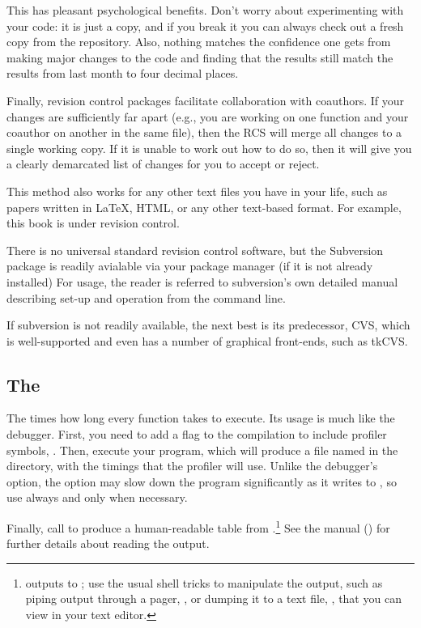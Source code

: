This has pleasant psychological benefits. Don't worry about experimenting
with your code: it is just a copy, and if you break it you can always check
out a fresh copy from the repository. Also, nothing matches the confidence
one gets from making major changes to the code and finding that the
results still match the results from last month to four decimal places.

Finally, revision control packages facilitate collaboration with
coauthors. If your changes are sufficiently far apart (e.g., you are
working on one function and your coauthor on another in the same file),
then the RCS will merge all changes to a single working copy. If
it is unable to work out how to do so, then it will give you a
clearly demarcated list of changes for you to accept or reject.

This method also works for any other text files you have in your
life, such as papers written in \LaTeX, HTML, or any other text-based
format. For example, this book is under revision control.

There is no universal standard revision control software, but the
Subversion package is readily avialable via your package manager (if it is
not already installed) For usage, the reader is referred to subversion's
own detailed manual describing set-up and operation from the command line.

If subversion is not readily available, the next best is its predecessor,
CVS, which is well-supported and even has a number of graphical
front-ends, such as tkCVS.  

\subsection{The } The  times how long every function
takes to execute. Its usage is much like the debugger. First, you need
to add a flag to the compilation to include profiler symbols,
. Then, execute your program, which will produce a file named
 in the directory, with the timings that the profiler
will use. Unlike the debugger's  option, the 
option may slow down the program significantly as it writes to
, so use  always and  only
when necessary.

Finally, call  to produce a
human-readable table from .\footnote{
outputs to ; use the usual shell tricks to manipulate
the output, such as piping output through a pager, , or dumping it to a text file, , that you can view in your text editor.}
See the manual () for further details about reading
the output.

